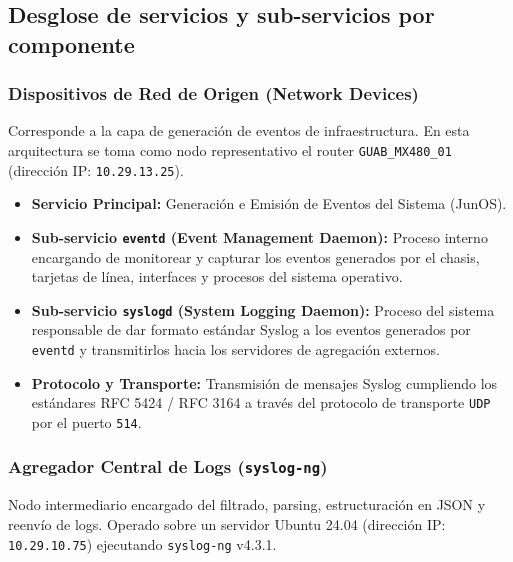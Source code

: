 \subsection{Desglose de servicios y sub-servicios por componente}

\subsubsection{Dispositivos de Red de Origen (Network Devices)}
Corresponde a la capa de generación de eventos de infraestructura. En esta arquitectura se toma como nodo representativo el router \texttt{GUAB\_MX480\_01} (dirección IP: \texttt{10.29.13.25}).

\begin{itemize}
    \item \textbf{Servicio Principal:} Generación e Emisión de Eventos del Sistema (JunOS).
    \item \textbf{Sub-servicio \texttt{eventd} (Event Management Daemon):} Proceso interno encargando de monitorear y capturar los eventos generados por el chasis, tarjetas de línea, interfaces y procesos del sistema operativo.
    \item \textbf{Sub-servicio \texttt{syslogd} (System Logging Daemon):} Proceso del sistema responsable de dar formato estándar Syslog a los eventos generados por \texttt{eventd} y transmitirlos hacia los servidores de agregación externos.
    \item \textbf{Protocolo y Transporte:} Transmisión de mensajes Syslog cumpliendo los estándares RFC 5424 / RFC 3164 a través del protocolo de transporte \texttt{UDP} por el puerto \texttt{514}.
\end{itemize}

\subsubsection{Agregador Central de Logs (\texttt{syslog-ng})}
Nodo intermediario encargado del filtrado, parsing, estructuración en JSON y reenvío de logs. Operado sobre un servidor Ubuntu 24.04 (dirección IP: \texttt{10.29.10.75}) ejecutando \texttt{syslog-ng} v4.3.1.

